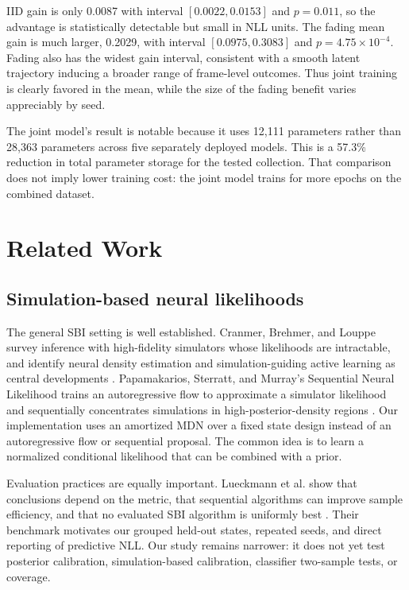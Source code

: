 \documentclass[10pt]{article}
\begin{document}
IID gain is only 0.0087 with interval $[0.0022,0.0153]$ and $p=0.011$, so the advantage is statistically detectable but small in NLL units. The fading mean gain is much larger, 0.2029, with interval $[0.0975,0.3083]$ and $p=4.75\times10^{-4}$. Fading also has the widest gain interval, consistent with a smooth latent trajectory inducing a broader range of frame-level outcomes. Thus joint training is clearly favored in the mean, while the size of the fading benefit varies appreciably by seed.

The joint model's result is notable because it uses 12,111 parameters rather than 28,363 parameters across five separately deployed models. This is a 57.3\% reduction in total parameter storage for the tested collection. That comparison does not imply lower training cost: the joint model trains for more epochs on the combined dataset.

\section{Related Work}

\subsection{Simulation-based neural likelihoods}

The general SBI setting is well established. Cranmer, Brehmer, and Louppe survey inference with high-fidelity simulators whose likelihoods are intractable, and identify neural density estimation and simulation-guiding active learning as central developments \cite{cranmer2020frontier}. Papamakarios, Sterratt, and Murray's Sequential Neural Likelihood trains an autoregressive flow to approximate a simulator likelihood and sequentially concentrates simulations in high-posterior-density regions \cite{papamakarios2019snl}. Our implementation uses an amortized MDN over a fixed state design instead of an autoregressive flow or sequential proposal. The common idea is to learn a normalized conditional likelihood that can be combined with a prior.

Evaluation practices are equally important. Lueckmann et al. show that conclusions depend on the metric, that sequential algorithms can improve sample efficiency, and that no evaluated SBI algorithm is uniformly best \cite{lueckmann2021benchmarking}. Their benchmark motivates our grouped held-out states, repeated seeds, and direct reporting of predictive NLL. Our study remains narrower: it does not yet test posterior calibration, simulation-based calibration, classifier two-sample tests, or coverage.
\end{document}
